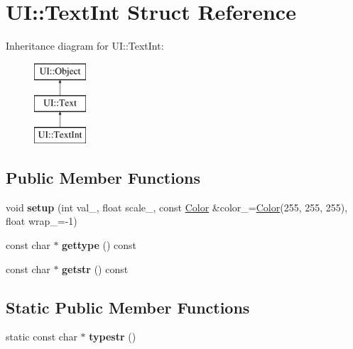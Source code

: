 \hypertarget{struct_u_i_1_1_text_int}{}\section{UI\+:\+:Text\+Int Struct Reference}
\label{struct_u_i_1_1_text_int}
Inheritance diagram for UI\+:\+:Text\+Int\+:\begin{figure}[H]
\begin{center}
\leavevmode
\includegraphics[height=3.000000cm]{struct_u_i_1_1_text_int}
\end{center}
\end{figure}
\subsection*{Public Member Functions}
\begin{DoxyCompactItemize}
\item 
\mbox{\label{struct_u_i_1_1_text_int_aeeb64ceff73c294b368c0481fee0497b}} 
void {\bfseries setup} (int val\+\_\+, float scale\+\_, const \hyperlink{struct_u_i_1_1_color}{Color} \&color\+\_\+=\hyperlink{struct_u_i_1_1_color}{Color}(255, 255, 255), float wrap\+\_\+=-\/1)
\item 
\mbox{\label{struct_u_i_1_1_text_int_a852104ffd3a2e277670a3d918d942b6f}} 
const char $\ast$ {\bfseries gettype} () const
\item 
\mbox{\label{struct_u_i_1_1_text_int_a5b53f70d9ee5e5da463a402c1e6eb9d9}} 
const char $\ast$ {\bfseries getstr} () const
\end{DoxyCompactItemize}
\subsection*{Static Public Member Functions}
\begin{DoxyCompactItemize}
\item 
\mbox{\label{struct_u_i_1_1_text_int_ac6355266521def0f808a405f123be476}} 
static const char $\ast$ {\bfseries typestr} ()
\end{DoxyCompactItemize}
